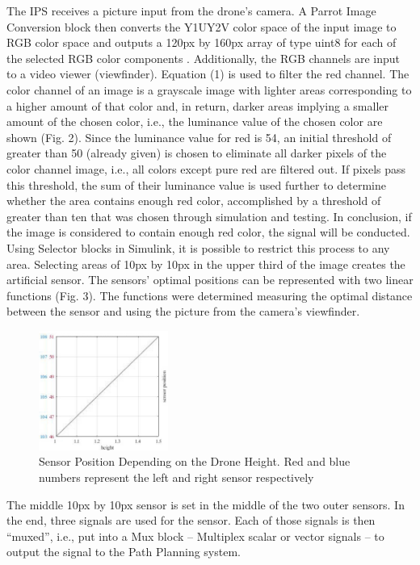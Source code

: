 \documentclass[a4paper, 10pt, conference]{IEEEtran}
\begin{document}
The IPS receives a picture input from the drone’s camera. A Parrot Image Conversion block then converts the Y1UY2V color space of the input image to RGB color space and outputs a 120px by 160px array of type uint8 for each of the selected RGB color components \cite{1}. Additionally, the RGB channels are input to a video viewer (viewfinder).
Equation (1) is used to filter the red channel. The color channel of an image is a grayscale image with lighter areas corresponding to a higher amount of that color and, in return, darker areas implying a smaller amount of the chosen color, i.e., the luminance value of the chosen color are shown (Fig. 2). Since the luminance value for red is 54, an initial threshold of greater than 50 (already given) is chosen to eliminate all darker pixels of the color channel image, i.e., all colors except pure red are filtered out. If pixels pass this threshold, the sum of their luminance value is used further to determine whether the area contains enough red color, accomplished by a threshold of greater than ten that was chosen through simulation and testing. In conclusion, if the image is considered to contain enough red color, the signal will be conducted.
Using Selector blocks in Simulink, it is possible to restrict this process to any area. Selecting areas of 10px by 10px in the upper third of the image creates the artificial sensor. The sensors’ optimal positions can be represented with two linear functions (Fig. 3). The functions were determined measuring the optimal distance between the sensor and using the picture from the camera’s viewfinder.
\begin{figure}
    \centering
    \includegraphics[width=160px]{graph.jpg}
    \caption{Sensor Position Depending on the Drone Height. Red and blue numbers represent the left and right sensor respectively}
    \label{fig:my_label} 
\end{figure}
The middle 10px by 10px sensor is set in the middle of the two outer sensors.
In the end, three signals are used for the sensor. Each of those signals is then “muxed”, i.e., put into a Mux block – Multiplex scalar or vector signals – to output the signal to the Path Planning system.\\
\end{document}
